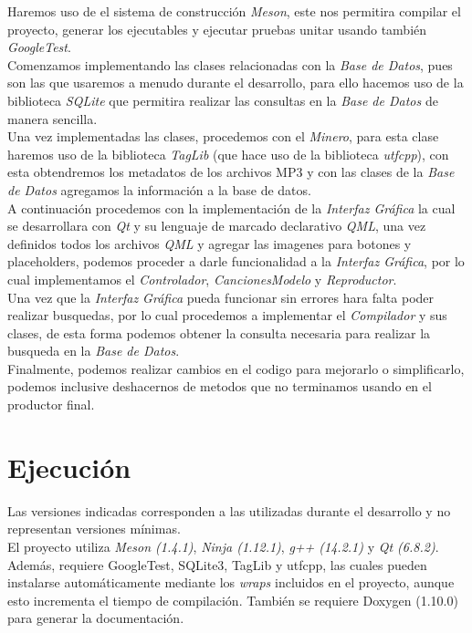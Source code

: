 \documentclass[12pt]{report}
\begin{document}
Haremos uso de el sistema de construcción \textit{Meson}, este nos permitira compilar el proyecto, generar los ejecutables y ejecutar pruebas unitar usando también \textit{GoogleTest}.\\

Comenzamos implementando las clases relacionadas con la \textit{Base de Datos}, pues son las que usaremos a menudo durante el desarrollo, para ello hacemos uso de la biblioteca \textit{SQLite} que permitira realizar las consultas en la \textit{Base de Datos} de manera sencilla.\\

Una vez implementadas las clases, procedemos con el \textit{Minero}, para esta clase haremos uso de la biblioteca \textit{TagLib} (que hace uso de la biblioteca \textit{utfcpp}), con esta obtendremos los metadatos de los archivos MP3 y con las clases de la \textit{Base de Datos} agregamos la información a la base de datos.\\

A continuación procedemos con la implementación de la \textit{Interfaz Gráfica} la cual se desarrollara con \textit{Qt} y su lenguaje de marcado declarativo \textit{QML}, una vez definidos todos los archivos \textit{QML} y agregar las imagenes para botones y placeholders, podemos proceder a darle funcionalidad a la \textit{Interfaz Gráfica}, por lo cual implementamos el \textit{Controlador}, \textit{CancionesModelo} y \textit{Reproductor}.\\

Una vez que la \textit{Interfaz Gráfica} pueda funcionar sin errores hara falta poder realizar busquedas, por lo cual procedemos a implementar el \textit{Compilador} y sus clases, de esta forma podemos obtener la consulta necesaria para realizar la busqueda en la \textit{Base de Datos}.\\

Finalmente, podemos realizar cambios en el codigo para mejorarlo o simplificarlo, podemos inclusive deshacernos de metodos que no terminamos usando en el productor final.\\

\section{Ejecución}
Las versiones indicadas corresponden a las utilizadas durante el desarrollo y no representan versiones mínimas.\\

El proyecto utiliza \textit{Meson (1.4.1)}, \textit{Ninja (1.12.1)}, \textit{g++ (14.2.1)} y \textit{Qt (6.8.2)}. Además, requiere GoogleTest, SQLite3, TagLib y utfcpp, las cuales pueden instalarse automáticamente mediante los \textit{wraps} incluidos en el proyecto, aunque esto incrementa el tiempo de compilación. También se requiere Doxygen (1.10.0) para generar la documentación.\\
\end{document}
